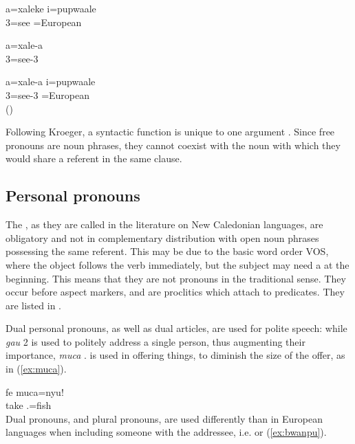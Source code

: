 	
	\ea\label{ex:xaleke_i}
	\gll a=xaleke i=pupwaale\\
	 3=see =European\\
	\glt {}
	\z
	
	\ea\label{ex:xalea}
	\gll a=xale-a\\
	 3=see-3\\
	\glt {}
	\z
	
	\ea\label{ex:xalea2}
	\gll *a=xale-a i=pupwaale\\
	  3=see-3 =European\\
	\glt ()
	\z
	
Following Kroeger, a syntactic function is unique to one argument \parencite[20]{kroeger_analyzing_2004}. Since free pronouns are noun phrases, they cannot coexist with the noun with which they would share a referent in the same clause. %

\subsection{Personal pronouns}
\label{ssec:persPN}

The , as they are called in the literature on New Caledonian languages, are obligatory and not in complementary distribution with open noun phrases possessing the same referent. This may be due to the basic word order VOS, where the object follows the verb immediately, but the subject may need a  at the beginning.
This means that they are not pronouns in the traditional sense. They occur before aspect markers, and are proclitics which attach to predicates. They are listed in . 

Dual personal pronouns, as well as dual articles, are used for polite speech: while \textit{gau} 2 is used to politely address a single person, thus augmenting their importance, \textit{muca} . is used in offering things, to diminish the size of the offer, as in (\ref{ex:muca}).

\ea \label{ex:muca}
\gll fe muca=nyu!\\
 take .=fish\\
\glt {}
\z
Dual pronouns, and plural pronouns, are used differently than in European languages when including someone with the addressee, i.e.  or  (\ref{ex:bwanpu}).

